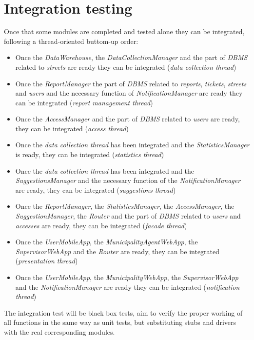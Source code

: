 \documentclass[a4paper]{report}
\begin{document}
\section{Integration testing}
Once that some modules are completed and tested alone they can be integrated, following a thread-oriented buttom-up order:
\begin{itemize}
\item Once the \textit{DataWarehouse}, the \textit{DataCollectionManager} and the part of \textit{DBMS} related to \textit{streets} are ready they can be integrated (\textit{data collection thread})
\item Once the \textit{ReportManager} the part of \textit{DBMS} related to \textit{reports}, \textit{tickets}, \textit{streets} and \textit{users} and the necessary function of \textit{NotificationManager} are ready they can be integrated  (\textit{report management thread})
\item Once the \textit{AccessManager} and the part of \textit{DBMS} related to \textit{users} are ready, they can be integrated (\textit{access thread})
\item Once the \textit{data collection thread} has been integrated and the \textit{StatisticsManager} is ready, they can be integrated  (\textit{statistics thread})
\item Once the \textit{data collection thread} has been integrated and the \textit{SuggestionsManager} and the necessary function of the \textit{NotificationManager} are ready, they can be integrated (\textit{suggestions thread})
\item Once the \textit{ReportManager}, the \textit{StatisticsManager}, the \textit{AccessManager}, the \textit{SuggestionManager}, the \textit{Router} and the part of \textit{DBMS} related to \textit{users} and \textit{accesses} are ready, they can be integrated (\textit{facade thread})
\item Once the \textit{UserMobileApp}, the \textit{MunicipalityAgentWebApp}, the \textit{SupervisorWebApp} and the \textit{Router} are ready, they can be integrated (\textit{presentation thread})
\item Once the \textit{UserMobileApp}, the \textit{MunicipalityWebApp}, the \textit{SupervisorWebApp} and the \textit{NotificationManager} are ready they can be integrated (\textit{notification thread})
\end{itemize}
The integration test will be black box tests, aim to verify the proper working of all functions in the same way as unit tests, but substituting stubs and drivers with the real corresponding modules.\\
\end{document}
